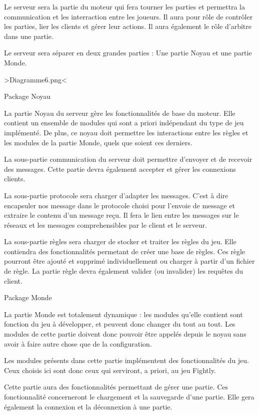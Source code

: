 \documentclass[a4paper,10pt]{report}
\begin{document}
Le serveur sera la partie du moteur qui fera tourner les parties et permettra la communication et les interraction entre les joueurs. Il aura pour rôle de contrôler les parties, lier les clients et gérer leur actions. Il aura également le rôle d'arbitre dans une partie. 

Le serveur sera séparer en deux grandes parties : Une partie Noyau et une partie Monde.

>Diagramme6.png<

Package Noyau

La partie Noyau du serveur gère les fonctionnalités de base du moteur. Elle contient un ensemble de modules qui sont a priori indépendant du type de jeu implémenté. De plus, ce noyau doit permettre les interactions entre les règles et les modules de la partie Monde, quels que soient ces derniers. 

La sous-partie communication du serveur doit permettre d'envoyer et de recevoir des messages. Cette partie devra également accepter et gérer les connexions clients.

La sous-partie protocole sera charger d'adapter les messages. C'est à dire encapsuler nos message dans le protocole choisi pour l'envoie de message et extraire le contenu d'un message reçu. Il fera le lien entre les messages sur le réseaux et les messages comprehensibles par le client et le serveur.

La sous-partie règles sera charger de stocker et traiter les règles du jeu. Elle contiendra des fonctionnalités permetant de créer une base de règles. Ces règle pourront être ajouté et supprimé individuellement ou charger à partir d'un fichier de règle. La partie règle devra également valider (ou invalider) les requêtes du client.



Package Monde

La partie Monde est totalement dynamique : les modules qu'elle contient sont fonction du jeu à développer, et peuvent donc changer du tout au tout. Les modules de cette partie doivent donc pouvoir être appelés depuis le noyau sans avoir à faire autre chose que de la configuration. 

Les modules présents dans cette partie implémentent des fonctionnalités du jeu. Ceux choisis ici sont donc ceux qui serviront, a priori, au jeu Fightly.

Cette partie aura des fonctionnalités permettant de gérer une partie. Ces fonctionnalité concerneront le chargement et la sauvegarde d'une partie. Elle gera également la connexion et la déconnexion à une partie.
\end{document}
